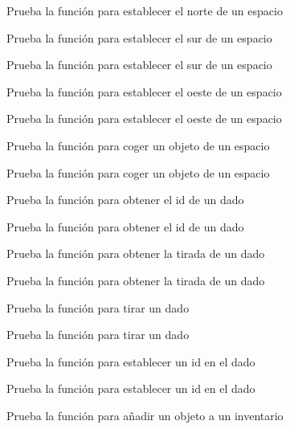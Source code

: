 \begin{DoxyRefList}
Prueba la función para establecer el norte de un espacio  
\item[\label{test__test000247}%
\Hypertarget{test__test000247}%
Member \hyperlink{space__test_8h_a21938e16547b3080e9251f960117a859}{test1\+\_\+space\+\_\+set\+\_\+south} ()]Prueba la función para establecer el sur de un espacio 

Prueba la función para establecer el sur de un espacio  
\item[\label{test__test000251}%
\Hypertarget{test__test000251}%
Member \hyperlink{space__test_8h_ab680a8797f793dffd58546074b87d21f}{test1\+\_\+space\+\_\+set\+\_\+west} ()]Prueba la función para establecer el oeste de un espacio 

Prueba la función para establecer el oeste de un espacio  
\item[\label{test__test000255}%
\Hypertarget{test__test000255}%
Member \hyperlink{space__test_8h_af97836868998ad4048dcce7bc92ba773}{test1\+\_\+space\+\_\+take\+\_\+object} ()]Prueba la función para coger un objeto de un espacio 

Prueba la función para coger un objeto de un espacio  
\item[\label{test__test000162}%
\Hypertarget{test__test000162}%
Member \hyperlink{die__test_8h_a9c76572bbb86ca9138b99a010e6a184a}{test2\+\_\+die\+\_\+get\+\_\+id} ()]Prueba la función para obtener el id de un dado 

Prueba la función para obtener el id de un dado  
\item[\label{test__test000166}%
\Hypertarget{test__test000166}%
Member \hyperlink{die__test_8h_a0832aa306964705770b2f1240763d962}{test2\+\_\+die\+\_\+get\+\_\+last\+\_\+roll} ()]Prueba la función para obtener la tirada de un dado 

Prueba la función para obtener la tirada de un dado  
\item[\label{test__test000164}%
\Hypertarget{test__test000164}%
Member \hyperlink{die__test_8h_af7df60d905acf9505f1e434c6f75d027}{test2\+\_\+die\+\_\+roll} ()]Prueba la función para tirar un dado 

Prueba la función para tirar un dado  
\item[\label{test__test000160}%
\Hypertarget{test__test000160}%
Member \hyperlink{die__test_8h_a7d829d0cae947aad0bc21ded843bd9ab}{test2\+\_\+die\+\_\+set\+\_\+id} ()]Prueba la función para establecer un id en el dado 

Prueba la función para establecer un id en el dado  
\item[\label{test__test000173}%
\Hypertarget{test__test000173}%
Member \hyperlink{inventory__test_8h_aa71b62b43df77830d47caa4237ee76a2}{test2\+\_\+inventory\+\_\+add\+\_\+object} ()]Prueba la función para añadir un objeto a un inventario 


\end{DoxyRefList}

